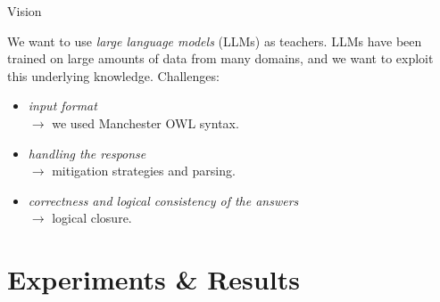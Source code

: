 \documentclass[presentation]{beamer}\mode<presentation>{\usetheme{blackAMSBolognaFC}}
\begin{document}
\begin{frame}[c]{Vision}

    We want to use \emph{large language models} (LLMs) as teachers.
    LLMs have been trained on large amounts of data from many domains, and we want to exploit this underlying knowledge.
    \vfill
    Challenges:
    \begin{itemize}
        \item \emph{input format}
        \\
        \quad $\rightarrow$ we used Manchester OWL syntax.
        \item \emph{handling the response}
        \\
        \quad $\rightarrow$ mitigation strategies and parsing.
        \item \emph{correctness and logical consistency of the answers}
        \\
        \quad $\rightarrow$ logical closure.
    \end{itemize}

\end{frame}

\section{Experiments \& Results}
\end{document}
